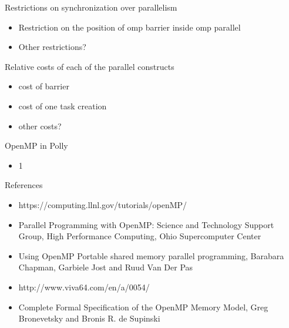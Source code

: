 \documentclass[10pt]{beamer}
\begin{document}
\begin{frame}{Restrictions on synchronization over parallelism}
\begin{itemize}
\item Restriction on the position of omp barrier inside omp parallel
\item Other restrictions?
\end{itemize}
\end{frame}

\begin{frame}{Relative costs of each of the parallel constructs}
\begin{itemize}
\item cost of barrier
\item cost of one task creation
\item other costs?
\end{itemize}
\end{frame}

\begin{frame}{OpenMP in Polly}
\begin{itemize}
\item 1
\end{itemize}
\end{frame}


\begin{frame}{References}
\begin{itemize}
\item https://computing.llnl.gov/tutorials/openMP/
\item Parallel Programming with OpenMP: Science and Technology Support Group, High Performance Computing, Ohio Supercomputer Center
\item Using OpenMP Portable shared memory parallel programming, Barabara Chapman, Garbiele Jost and Ruud Van Der Pas
\item http://www.viva64.com/en/a/0054/
\item Complete Formal Specification of the OpenMP Memory Model,
  Greg Bronevetsky and Bronis R. de Supinski
\end{itemize}
\end{frame}
\end{document}
